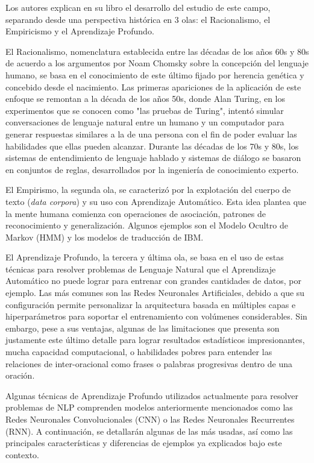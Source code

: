 Los autores \citeauthor{bk_deng2018deeplearningnlp} explican en su libro  el desarrollo del estudio de este campo, separando desde una perspectiva histórica en 3 olas: el Racionalismo, el Empiricismo y el Aprendizaje Profundo.

El Racionalismo, nomenclatura establecida entre las décadas de los años 60s y 80s de acuerdo a los argumentos por Noam Chomsky sobre la concepción del lenguaje humano, se basa en el conocimiento de este último fijado por herencia genética y concebido desde el nacimiento. Las primeras apariciones de la aplicación de este enfoque se remontan a la década de los años 50s, donde Alan Turing, en los experimentos que se conocen como "las pruebas de Turing", intentó simular conversaciones de lenguaje natural entre un humano y un computador para generar respuestas similares a la de una persona con el fin de poder evaluar las habilidades que ellas pueden alcanzar. Durante las décadas de los 70s y 80s, los sistemas de entendimiento de lenguaje hablado y sistemas de diálogo se basaron en conjuntos de reglas, desarrollados por la ingeniería de conocimiento experto.

El Empirismo, la segunda ola, se caracterizó por la explotación del cuerpo de texto (\textit{data corpora}) y su uso con Aprendizaje Automático. Esta idea plantea que la mente humana comienza con operaciones de asociación, patrones de reconocimiento y generalización. Algunos ejemplos son el Modelo Ocultro de Markov (HMM) y los modelos de traducción de IBM.

El Aprendizaje Profundo, la tercera y última ola, se basa en el uso de estas técnicas para resolver problemas de Lenguaje Natural que el Aprendizaje Automático no puede lograr para entrenar con grandes cantidades de datos, por ejemplo. Las más comunes son las Redes Neuronales Artificiales, debido a que su configuración permite personalizar la arquitectura basada en múltiples capas e hiperparámetros para soportar el entrenamiento con volúmenes considerables. Sin embargo, pese a sus ventajas, algunas de las limitaciones que presenta son justamente este último detalle para lograr resultados estadísticos impresionantes, mucha capacidad computacional, o habilidades pobres para entender las relaciones de inter-oracional como frases o palabras progresivas dentro de una oración.

Algunas técnicas de Aprendizaje Profundo utilizados actualmente para resolver problemas de NLP comprenden modelos anteriormente mencionados como las Redes Neuronales Convolucionales (CNN) o las Redes Neuronales Recurrentes (RNN). A continuación, se detallarán algunas de las más usadas, así como las principales características y diferencias de ejemplos ya explicados bajo este contexto.

